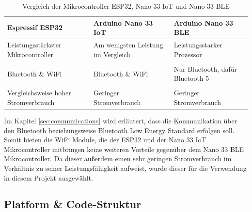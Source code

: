         \begin{table}[H]
            \caption{Vergleich der Mikrocontroller ESP32, Nano 33 IoT und Nano 33 BLE}
            \centering
            \begin{tabularx}{\textwidth}{  X | X | X  }
                \textbf{Espressif ESP32} & \textbf{Arduino Nano 33 IoT} & \textbf{Arduino Nano 33 BLE}\\ [0.5ex] \hline\hline
                Leistungsstärkster Mikrocontroller &
                Am wenigsten Leistung im Vergleich &
                Leistungsstarker Prozessor\\
                &&\\
                Bluetooth \& WiFi &
                Bluetooth \& WiFi &
                Nur Bluetooth, dafür Bluetooth 5 \\
                &&\\
                Vergleichsweise hoher Stromverbrauch &
                Geringer Stromverbrauch &
                Geringer Stromverbrauch \\
            \end{tabularx}
            \label{tab:compare_mics}
        \end{table}

        Im Kapitel \ref{sec:communications} wird erläutert, dass die Kommunikation über den Bluetooth beziehungsweise Bluetooth Low Energy Standard erfolgen soll. Somit bieten die WiFi Module, die der ESP32 und der Nano 33 IoT Mikrocontroller mitbringen keine weiteren Vorteile gegenüber dem Nano 33 BLE Mikrocontroller. Da dieser außerdem einen sehr geringen Stromverbrauch im Verhältnis zu seiner Leistungsfähigkeit aufweist, wurde dieser für die Verwendung in diesem Projekt ausgewählt.


    \subsection{Platform \& Code-Struktur}\label{sec:platform}

